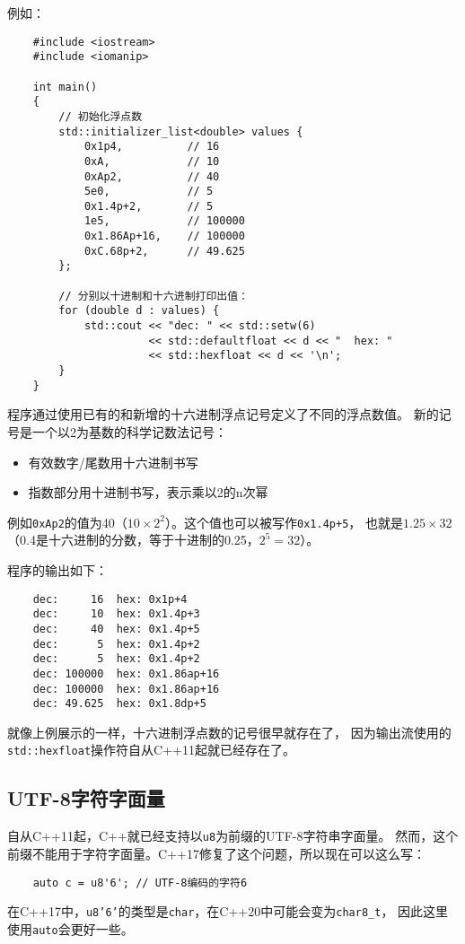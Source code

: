 例如：
\begin{lstlisting}
    #include <iostream>
    #include <iomanip>

    int main()
    {
        // 初始化浮点数
        std::initializer_list<double> values {
            0x1p4,          // 16
            0xA,            // 10
            0xAp2,          // 40
            5e0,            // 5
            0x1.4p+2,       // 5
            1e5,            // 100000
            0x1.86Ap+16,    // 100000
            0xC.68p+2,      // 49.625
        };

        // 分别以十进制和十六进制打印出值：
        for (double d : values) {
            std::cout << "dec: " << std::setw(6)
                      << std::defaultfloat << d << "  hex: "
                      << std::hexfloat << d << '\n';
        }
    }
\end{lstlisting}
程序通过使用已有的和新增的十六进制浮点记号定义了不同的浮点数值。
新的记号是一个以2为基数的科学记数法记号：
\begin{itemize}[leftmargin=*]
    \item 有效数字/尾数用十六进制书写
    \item 指数部分用十进制书写，表示乘以2的n次幂
\end{itemize}
例如\texttt{0xAp2}的值为40（$10\times2^2$）。这个值也可以被写作\texttt{0x1.4p+5}，
也就是$1.25\times32$（0.4是十六进制的分数，等于十进制的0.25，$2^5=32$）。

程序的输出如下：
\begin{lstlisting}
    dec:     16  hex: 0x1p+4
    dec:     10  hex: 0x1.4p+3
    dec:     40  hex: 0x1.4p+5
    dec:      5  hex: 0x1.4p+2
    dec:      5  hex: 0x1.4p+2
    dec: 100000  hex: 0x1.86ap+16
    dec: 100000  hex: 0x1.86ap+16
    dec: 49.625  hex: 0x1.8dp+5
\end{lstlisting}
就像上例展示的一样，十六进制浮点数的记号很早就存在了，
因为输出流使用的\texttt{std::hexfloat}操作符自从C++11起就已经存在了。

\subsection{UTF-8字符字面量}\label{ch8.6}
自从C++11起，C++就已经支持以\texttt{u8}为前缀的UTF-8字符串字面量。
然而，这个前缀不能用于字符字面量。C++17修复了这个问题，所以现在可以这么写：
\begin{lstlisting}
    auto c = u8'6'; // UTF-8编码的字符6
\end{lstlisting}
在C++17中，\texttt{u8'6'}的类型是\texttt{char}，在C++20中可能会变为\texttt{char8\_t}，
因此这里使用\texttt{auto}会更好一些。

